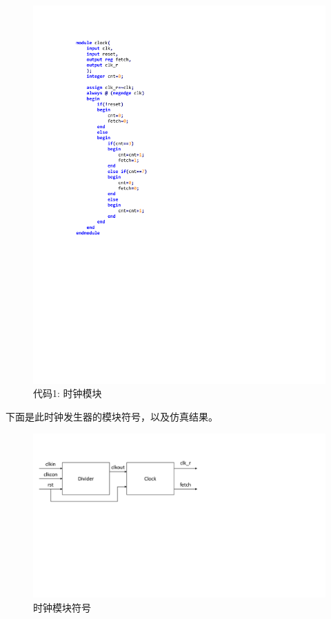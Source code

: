 \documentclass[titlepage, 11pt]{article}
\begin{document}
\begin{figure}[H]
\begin{minipage}[H]{0.5\linewidth}
			\includegraphics[scale=1]{14.pdf}  
			\caption*{}  
			\end{minipage}
			\caption*{代码1: 时钟模块}  
		\end{figure} 
		下面是此时钟发生器的模块符号，以及仿真结果。
		\begin{figure}[H]
			\includegraphics[scale=0.5]{15.pdf}
			\caption{时钟模块符号}
		\end{figure}
\end{document}
